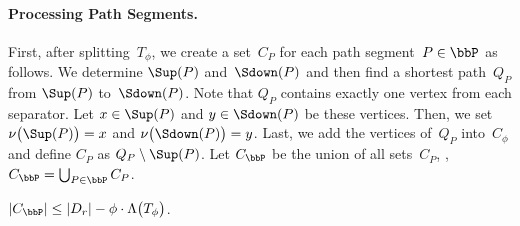 \paragraph{Processing Path Segments.}
First, after splitting~$T_\phi$, we create a set~$C_{P}$ for each path segment~$P \in \bbP$ as follows.
We determine $\Sup(P)$ and~$\Sdown(P)$ and then find a shortest path~$Q_P$ from $\Sup(P)$ to~$\Sdown(P)$.
Note that $Q_P$ contains exactly one vertex from each separator.
Let $x \in \Sup(P)$ and $y \in \Sdown(P)$ be these vertices.
Then, we set $\nu \big( \Sup(P) \big) = x$ and $\nu \big( \Sdown(P) \big) = y$.
Last, we add the vertices of~$Q_P$ into~$C_\phi$ and define $C_P$ as $Q_P \setminus \Sup(P)$.
Let $C_\bbP$ be the union of all sets~$C_P$, \ie, $C_\bbP = \bigcup_{P \in \bbP} C_P$.

\begin{lemma}
    \label{lem:CPcardinality}
\( |C_\bbP| \leq |D_r| - \phi \cdot \Lambda \big( T_\phi \big) \).
\end{lemma}

